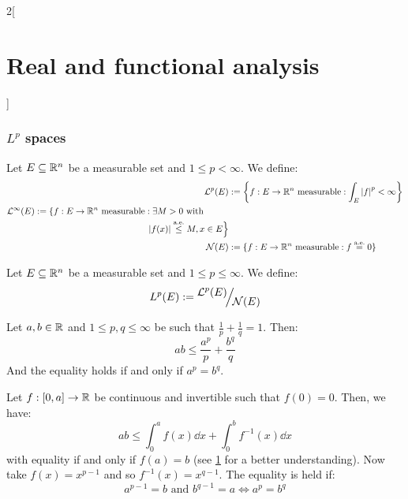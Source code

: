 \documentclass[../../../main_math.tex]{subfiles}
\begin{document}
\begin{multicols}{2}[\section{Real and functional analysis}]
  \subsubsection{\texorpdfstring{$L^p$}{Lp} spaces}
  \begin{definition}
    Let $E\subseteq\mathbb{R}^n$ be a measurable set and $1\leq p<\infty$. We define:
    \begin{align*}
      \mathcal{L}^p(E) & :=\left\{{f}:E\rightarrow \RR^n\text{ measurable}:\int_E\abs{{f}}^p<\infty\right\}                                                                                                          \\
      \begin{split}
        \mathcal{L}^\infty(E) &:=\left\{{f}:E\rightarrow \RR^n\text{ measurable}:\exists M>0\text{ with }\right.\\&\hspace{4.4cm}\left.\abs{{f}(x)}\almoste{\leq} M, x\in E\right\}
      \end{split} \\
      \mathcal{N}(E)   & :=\{{f}:E\rightarrow \RR^n\text{ measurable}:{f}\almoste{=} 0\}
    \end{align*}
  \end{definition}
  \begin{definition}
    Let $E\subseteq\mathbb{R}^n$ be a measurable set and $1\leq p\leq\infty$. We define: $$L^p(E):=\quot{\mathcal{L}^p(E)}{\mathcal{N}(E)}$$
  \end{definition}
  \begin{lemma}\label{RFA_young}
    Let $a,b\in\mathbb{R}$ and $1\leq p,q\leq \infty$ be such that $\frac{1}{p}+\frac{1}{q}=1$. Then:
    $$ab\leq\frac{a^p}{p}+\frac{b^q}{q}$$
    And the equality holds if and only if $a^p=b^q$.
  \end{lemma}
  \begin{sproof}
    Let $f:[0,a]\rightarrow\mathbb{R}$ be continuous and invertible such that $f(0)=0$. Then, we have:
    $$ab\leq \int_{0}^{a}f(x)\dd{x}+\int_{0}^{b}f^{-1}(x)\dd{x}$$
    with equality if and only if $f(a)=b$ (see \cref{RFA_youngfigure} for a better understanding). Now take $f(x)= x^{p-1}$ and so $f^{-1}(x)=x^{q-1}$. The equality is held if: $$a^{p-1} = b\text{ and }b^{q-1}=a\iff a^p = b^q$$
    \begin{figure}[H]
      \centering
      
      \caption{}
      \label{RFA_youngfigure}
    \end{figure}

\end{sproof}
\end{multicols}
\end{document}
